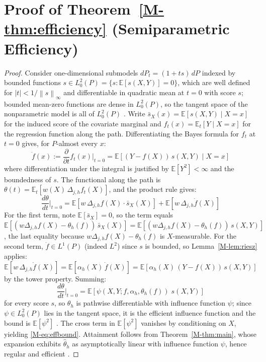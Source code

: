 \documentclass[12pt,a4paper]{article}
\numberwithin{equation}{section}
\theoremstyle{plain}
\theoremstyle{definition}
\newcommand{\norm}[1]{\left\| #1 \right\|}
\newcommand{\E}{\mathbb{E}}
\newcommand{\abs}[1]{\left| #1 \right|}
\newcommand{\Dh}{\Delta_{j,h}}
\begin{document}
	\section{Proof of Theorem~\ref{M-thm:efficiency} (Semiparametric Efficiency)}
	\label{app:thm_eff}
	
	\begin{proof}
		Consider one-dimensional submodels
		$dP_t = (1 + t s)\, dP$ indexed by bounded functions
		$s \in L^2_0(P) = \{s : \E[s(X, Y)] = 0\}$, which are well defined for
		$\abs{t} < 1/\norm{s}_\infty$ and differentiable in quadratic mean at $t = 0$
		with score $s$; bounded mean-zero functions are dense in $L^2_0(P)$, so the
		tangent space of the nonparametric model is all of $L^2_0(P)$
		\citep[Chapter~25]{vaart1998}. Write
		$\bar{s}_X(x) = \E[s(X, Y) \mid X = x]$ for the induced score of the
		covariate marginal and
		$f_t(x) = \E_t[Y \mid X = x]$ for the regression function along the path.
		Differentiating the Bayes formula for $f_t$ at $t = 0$ gives, for
		$P$-almost every $x$:
		\begin{equation}
			\dot{f}(x) := \frac{\partial}{\partial t} f_t(x)\Big|_{t=0}
			= \E\left[(Y - f(X))\, s(X, Y) \mid X = x\right]
		\end{equation}
		where differentiation under the integral is justified by
		$\E[Y^2] < \infty$ and the boundedness of $s$. The functional along the path
		is $\theta(t) = \E_t[w(X)\, \Dh f_t(X)]$, and the product rule gives:
		\begin{equation}
			\frac{d\theta}{dt}\Big|_{t=0}
			= \E\left[w\, \Dh f(X)\cdot \bar{s}_X(X)\right]
			+ \E\left[w\, \Dh \dot{f}(X)\right]
		\end{equation}
		For the first term, note $\E[\bar{s}_X] = 0$, so the term equals
		$\E[(w \Dh f(X) - \theta_h(f))\, \bar{s}_X(X)]
		= \E[(w \Dh f(X) - \theta_h(f))\, s(X, Y)]$, the last equality because
		$w \Dh f(X) - \theta_h(f)$ is $X$-measurable. For the second term,
		$\dot{f} \in L^1(P)$ (indeed $L^2$) since $s$ is bounded, so
		Lemma~\ref{M-lem:riesz} applies:
		\begin{equation}
			\E\left[w\, \Dh \dot{f}(X)\right]
			= \E\left[\alpha_h(X)\, \dot{f}(X)\right]
			= \E\left[\alpha_h(X)\,(Y - f(X))\, s(X, Y)\right]
		\end{equation}
		by the tower property. Summing:
		\begin{equation}
			\frac{d\theta}{dt}\Big|_{t=0}
			= \E\left[\psi(X, Y; f, \alpha_h, \theta_h(f))\; s(X, Y)\right]
		\end{equation}
		for every score $s$, so $\theta_h$ is pathwise differentiable with influence
		function $\psi$; since $\psi \in L^2_0(P)$ lies in the tangent space, it is
		the efficient influence function and the bound is
		$\E[\psi^2]$ \citep[Theorem~25.20]{vaart1998}. The cross term in
		$\E[\psi^2]$ vanishes by conditioning on $X$, yielding
		\eqref{M-eq:effbound}. Attainment follows from Theorem~\ref{M-thm:main}, whose
		expansion exhibits $\hat{\theta}_h$ as asymptotically linear with influence
		function $\psi$, hence regular and efficient
		\citep[Lemma~25.23]{vaart1998}.
	\end{proof}
	
\end{document}
